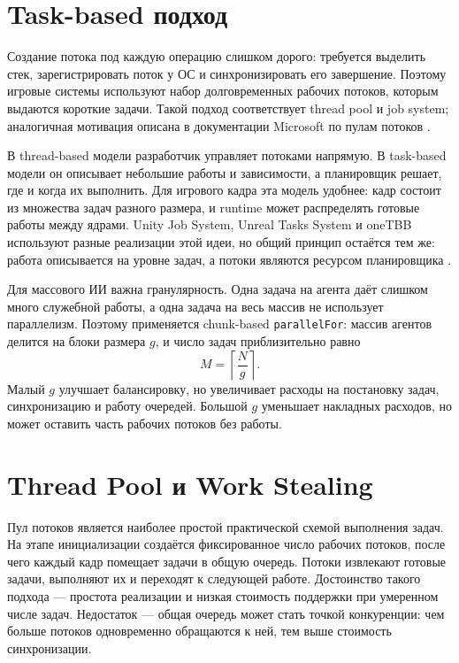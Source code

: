 \documentclass[14pt,a4paper,oneside]{extreport}
\begin{document}
\section{Task-based подход}

Создание потока под каждую операцию слишком дорого: требуется выделить стек, зарегистрировать поток у ОС и синхронизировать его завершение. Поэтому игровые системы используют набор долговременных рабочих потоков, которым выдаются короткие задачи. Такой подход соответствует thread pool и job system; аналогичная мотивация описана в документации Microsoft по пулам потоков \cite{ms_thread_pool}.

В thread-based модели разработчик управляет потоками напрямую. В task-based модели он описывает небольшие работы и зависимости, а планировщик решает, где и когда их выполнить. Для игрового кадра эта модель удобнее: кадр состоит из множества задач разного размера, и runtime может распределять готовые работы между ядрами. Unity Job System, Unreal Tasks System и oneTBB используют разные реализации этой идеи, но общий принцип остаётся тем же: работа описывается на уровне задач, а потоки являются ресурсом планировщика \cite{unity_job_system,unreal_tasks_system,onetbb_scheduler}.

Для массового ИИ важна гранулярность. Одна задача на агента даёт слишком много служебной работы, а одна задача на весь массив не использует параллелизм. Поэтому применяется chunk-based \texttt{parallelFor}: массив агентов делится на блоки размера \(g\), и число задач приблизительно равно
\begin{equation}
M = \left\lceil \frac{N}{g} \right\rceil .
\end{equation}
Малый \(g\) улучшает балансировку, но увеличивает расходы на постановку задач, синхронизацию и работу очередей. Большой \(g\) уменьшает накладных расходов, но может оставить часть рабочих потоков без работы.

\section{Thread Pool и Work Stealing}

Пул потоков является наиболее простой практической схемой выполнения задач. На этапе инициализации создаётся фиксированное число рабочих потоков, после чего каждый кадр помещает задачи в общую очередь. Потоки извлекают готовые задачи, выполняют их и переходят к следующей работе. Достоинство такого подхода --- простота реализации и низкая стоимость поддержки при умеренном числе задач. Недостаток --- общая очередь может стать точкой конкуренции: чем больше потоков одновременно обращаются к ней, тем выше стоимость синхронизации.
\end{document}
